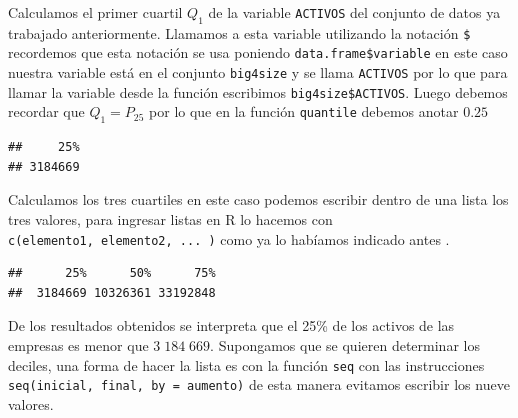\documentclass[letterpaper,]{book}
\newenvironment{Shaded}{\begin{snugshade}}{\end{snugshade}}
\newcommand{\DataTypeTok}[1]{\textcolor[rgb]{0.13,0.29,0.53}{#1}}
\newcommand{\FloatTok}[1]{\textcolor[rgb]{0.00,0.00,0.81}{#1}}
\newcommand{\KeywordTok}[1]{\textcolor[rgb]{0.13,0.29,0.53}{\textbf{#1}}}
\newcommand{\NormalTok}[1]{#1}
\newcommand{\OperatorTok}[1]{\textcolor[rgb]{0.81,0.36,0.00}{\textbf{#1}}}
\begin{document}
Calculamos el primer cuartil \(Q_{1}\) de la variable \texttt{ACTIVOS} del conjunto de datos ya trabajado anteriormente. Llamamos a esta variable utilizando la notación \texttt{\$} recordemos que esta notación se usa poniendo \texttt{data.frame\$variable} en este caso nuestra variable está en el conjunto \texttt{big4size} y se llama \texttt{ACTIVOS} por lo que para llamar la variable desde la función escribimos \texttt{big4size\$ACTIVOS}. Luego debemos recordar que \(Q_1=P_{25}\) por lo que en la función \texttt{quantile} debemos anotar \(0.25\)

\begin{Shaded}
\end{Shaded}

\begin{verbatim}
##     25% 
## 3184669
\end{verbatim}

Calculamos los tres cuartiles en este caso podemos escribir dentro de una lista los tres valores, para ingresar listas en R lo hacemos con \texttt{c(elemento1,\ elemento2,\ ...\ )} como ya lo habíamos indicado antes \citep{williams2017}.

\begin{Shaded}
\end{Shaded}

\begin{verbatim}
##      25%      50%      75% 
##  3184669 10326361 33192848
\end{verbatim}

De los resultados obtenidos se interpreta que el 25\% de los activos de las empresas es menor que \(3\;184\;669\). Supongamos que se quieren determinar los deciles, una forma de hacer la lista es con la función \texttt{seq} con las instrucciones \texttt{seq(inicial,\ final,\ by\ =\ aumento)} de esta manera evitamos escribir los nueve valores.

\begin{Shaded}
\end{Shaded}
\end{document}
